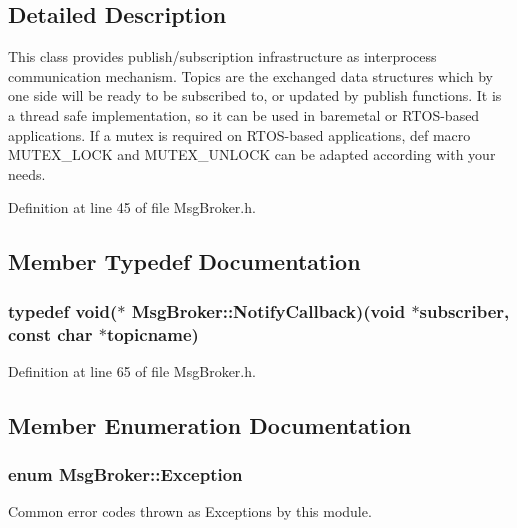 \subsection{Detailed Description}
This class provides publish/subscription infrastructure as interprocess communication mechanism. Topics are the exchanged data structures which by one side will be ready to be subscribed to, or updated by publish functions. It is a thread safe implementation, so it can be used in baremetal or R\-T\-O\-S-\/based applications. If a mutex is required on R\-T\-O\-S-\/based applications, def macro M\-U\-T\-E\-X\-\_\-\-L\-O\-C\-K and M\-U\-T\-E\-X\-\_\-\-U\-N\-L\-O\-C\-K can be adapted according with your needs. 

Definition at line 45 of file Msg\-Broker.\-h.



\subsection{Member Typedef Documentation}
\hypertarget{class_msg_broker_a830cd79418898c03e6b144b1e47d68d1}{
\subsubsection[{Notify\-Callback}]{\setlength{\rightskip}{0pt plus 5cm}typedef void($\ast$ Msg\-Broker\-::\-Notify\-Callback)(void $\ast$subscriber, const char $\ast$topicname)}}\label{class_msg_broker_a830cd79418898c03e6b144b1e47d68d1}


Definition at line 65 of file Msg\-Broker.\-h.



\subsection{Member Enumeration Documentation}
\hypertarget{class_msg_broker_a29a59609f9ec3a1b8022f98f228f3c9c}{
\subsubsection[{Exception}]{\setlength{\rightskip}{0pt plus 5cm}enum {\bf Msg\-Broker\-::\-Exception}}}\label{class_msg_broker_a29a59609f9ec3a1b8022f98f228f3c9c}


Common error codes thrown as Exceptions by this module. 

